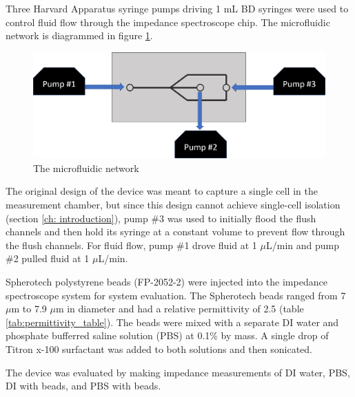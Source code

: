 \par Three Harvard Apparatus syringe pumps driving 1 mL BD syringes were used to control fluid flow through the impedance spectroscope chip. The microfluidic network is diagrammed in figure \ref{fig:ufluidic_network}.

\begin{figure}[h]
    \centering
    \includegraphics[width=\textwidth]{images/fluidics_system.png}
    \caption{The microfluidic network}
    \label{fig:ufluidic_network}
\end{figure}

\par The original design of the device was meant to capture a single cell in the measurement chamber, but since this design cannot achieve single-cell isolation (section \ref{ch: introduction}), pump \#3 was used to initially flood the flush channels and then hold its syringe at a constant volume to prevent flow through the flush channels. For fluid flow, pump \#1 drove fluid at 1 $\mu$L/min and pump \#2 pulled fluid at 1 $\mu$L/min. 


\par Spherotech polystyrene beads (FP-2052-2) were injected into the impedance spectroscope system for system evaluation. The Spherotech beads ranged from 7 $\mu$m to 7.9 $\mu$m in diameter and had a relative permittivity of 2.5 (table \ref{tab:permittivity_table}). The beads were mixed with a separate DI water and phosphate bufferred saline solution (PBS) at 0.1\% by mass. A single drop of Titron x-100 surfactant was added to both solutions and then sonicated.

\par The device was evaluated by making impedance measurements of DI water, PBS, DI with beads, and PBS with beads. 

